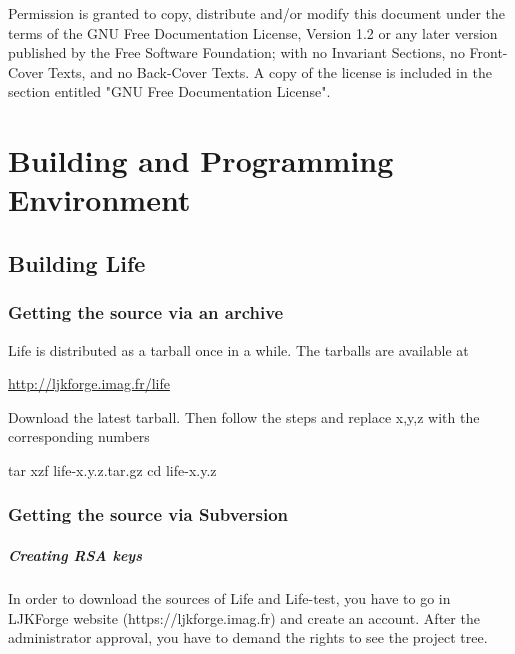 \documentclass[a4paper]{book}
\begin{document}
\begin{center}
\end{center}

\vfill \mbox{} \clearpage

\thispagestyle{empty}


\vfill
Permission is granted to copy, distribute and/or modify this document
under the terms of the GNU Free Documentation License, Version 1.2
or any later version published by the Free Software Foundation;
with no Invariant Sections, no Front-Cover Texts, and no Back-Cover Texts.
A copy of the license is included in the section entitled "GNU
Free Documentation License".

\newpage

\tableofcontents

\chapter{Building and Programming Environment}


\section{Building Life}

\subsection{Getting the source via an archive}
\label{sec:getting-source-via-1}

Life is distributed as a tarball once in a while. The tarballs are available
at
\begin{center}
  \href{http://ljkforge.imag.fr/life}{http://ljkforge.imag.fr/life}
\end{center}
Download the latest tarball. Then follow the steps and replace x,y,z
with the corresponding numbers

\begin{unixcom}
  tar xzf life-x.y.z.tar.gz
  cd life-x.y.z
\end{unixcom}


\subsection{Getting the source via Subversion}
\label{sec:getting-source-via}

\paragraph{Creating RSA keys}
\label{sec:creation-rsa-keys}
In order to download the sources of Life and Life-test, you have to go in
LJKForge website (https://ljkforge.imag.fr) and create an account. After the
administrator approval, you have to demand the rights to see the project tree.
\end{document}
